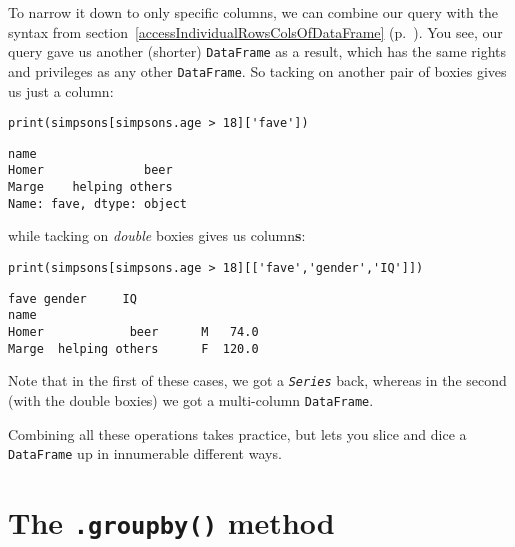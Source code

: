 To narrow it down to only specific columns, we can combine our query with the
syntax from section~\ref{accessIndividualRowsColsOfDataFrame}
(p.~\pageref{accessIndividualRowsColsOfDataFrame}). You see, our query gave us
another (shorter) \texttt{DataFrame} as a result, which has the same rights and
privileges as any other \texttt{DataFrame}. So tacking on another pair of
boxies gives us just a column:

\begin{Verbatim}[fontsize=\small,samepage=true,frame=single,framesep=3mm]
print(simpsons[simpsons.age > 18]['fave'])
\end{Verbatim}
\vspace{-.2in}

\begin{Verbatim}[fontsize=\small,samepage=true,frame=leftline,framesep=5mm,framerule=1mm]
name
Homer              beer
Marge    helping others
Name: fave, dtype: object
\end{Verbatim}

while tacking on \textit{double} boxies gives us column\textbf{s}:

\begin{Verbatim}[fontsize=\small,samepage=true,frame=single,framesep=3mm]
print(simpsons[simpsons.age > 18][['fave','gender','IQ']])
\end{Verbatim}
\vspace{-.2in}

\begin{Verbatim}[fontsize=\small,samepage=true,frame=leftline,framesep=5mm,framerule=1mm]
                 fave gender     IQ
name                               
Homer            beer      M   74.0
Marge  helping others      F  120.0
\end{Verbatim}

Note that in the first of these cases, we got a \textit{\texttt{Series}} back,
whereas in the second (with the double boxies) we got a multi-column
\texttt{DataFrame}.

Combining all these operations takes practice, but lets you slice and dice a
\texttt{DataFrame} up in innumerable different ways.

\section{The \texttt{.groupby()} method}


